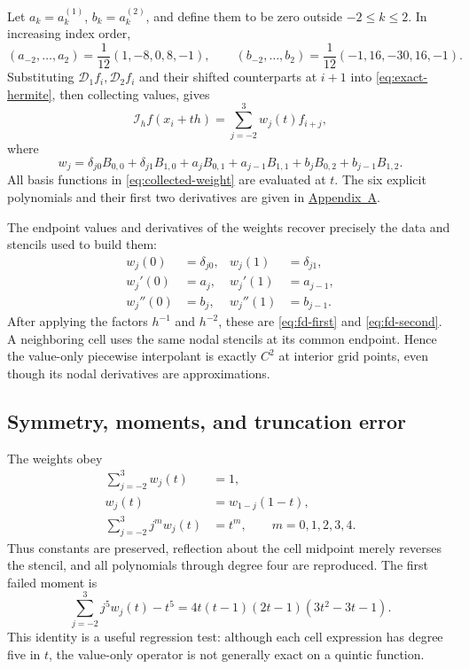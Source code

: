 \documentclass[11pt]{article}
\newcommand{\I}{\mathcal{I}}
\newcommand{\D}{\mathcal{D}}
\begin{document}
Let $a_k=a_k^{(1)}$, $b_k=a_k^{(2)}$, and define them to be zero outside
$-2\leq k\leq2$.  In increasing index order,
\begin{equation}
  (a_{-2},\ldots,a_2)=\frac1{12}(1,-8,0,8,-1),\qquad
  (b_{-2},\ldots,b_2)=\frac1{12}(-1,16,-30,16,-1).
  \label{eq:fd-coefficients}
\end{equation}
Substituting \(\D_1 f_i,\D_2 f_i\) and their shifted counterparts at
$i+1$ into \eqref{eq:exact-hermite}, then collecting values, gives
\begin{equation}
  \I_h f(x_i+th)=\sum_{j=-2}^{3}w_j(t)f_{i+j},
  \label{eq:six-point-interpolant}
\end{equation}
where
\begin{equation}
  \boxed{
  w_j=\delta_{j0}B_{0,0}+\delta_{j1}B_{1,0}
      +a_j B_{0,1}+a_{j-1}B_{1,1}
      +b_j B_{0,2}+b_{j-1}B_{1,2}.}
  \label{eq:collected-weight}
\end{equation}
All basis functions in \eqref{eq:collected-weight} are evaluated at $t$.
The six explicit polynomials and their first two derivatives are given in
\hyperref[app:formulas]{Appendix~A}.

The endpoint values and derivatives of the weights recover precisely the
data and stencils used to build them:
\begin{align}
  w_j(0)&=\delta_{j0},& w_j(1)&=\delta_{j1},\nonumber\\
  w_j'(0)&=a_j,& w_j'(1)&=a_{j-1},\label{eq:weight-endpoints}\\
  w_j''(0)&=b_j,& w_j''(1)&=b_{j-1}.\nonumber
\end{align}
After applying the factors $h^{-1}$ and $h^{-2}$, these are
\eqref{eq:fd-first} and \eqref{eq:fd-second}.  A neighboring cell uses the
same nodal stencils at its common endpoint.  Hence the value-only piecewise
interpolant is exactly $C^2$ at interior grid points, even though its nodal
derivatives are approximations.

\subsection{Symmetry, moments, and truncation error}

The weights obey
\begin{align}
  \sum_{j=-2}^{3}w_j(t)&=1,
  \label{eq:partition-unity}\\
  w_j(t)&=w_{1-j}(1-t),
  \label{eq:weight-reflection}\\
  \sum_{j=-2}^{3}j^m w_j(t)&=t^m,
  \qquad m=0,1,2,3,4.
  \label{eq:weight-moments}
\end{align}
Thus constants are preserved, reflection about the cell midpoint merely
reverses the stencil, and all polynomials through degree four are reproduced.
The first failed moment is
\begin{equation}
  \sum_{j=-2}^{3}j^5w_j(t)-t^5
  =4t(t-1)(2t-1)(3t^2-3t-1).
  \label{eq:fifth-moment-defect}
\end{equation}
This identity is a useful regression test: although each cell expression has
degree five in $t$, the value-only operator is not generally exact on a
quintic function.
\end{document}
